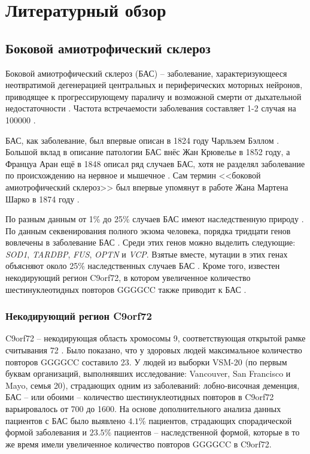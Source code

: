 \chapter{Литературный обзор} \label{chapt1}

\section{Боковой амиотрофический склероз} \label{sect_ALS}

Боковой амиотрофический склероз (БАС) -- заболевание, характеризующееся неотвратимой дегенерацией центральных и периферических моторных нейронов, приводящее к прогрессирующему параличу и возможной смерти от дыхательной недостаточности \cite{Alavi2013,Andersen2003,Drechsel2012,Haidet-Phillips2011}. Частота встречаемости заболевания составляет 1-2 случая на 100000 \cite{Alavi2013,Brotherton2012,Brown1997}.

БАС, как заболевание, был впервые описан в 1824 году Чарльзем Бэллом \cite{Rowland2001}. Большой вклад в описание патологии БАС внёс Жан Крювелье в 1852 году, а Француа Аран ещё в 1848 описал ряд случаев БАС, хотя не разделял заболевание по происхождению на нервное и мышечное \cite{Rowland2001, Marangi2015}. Сам термин <<боковой амиотрофический склероз>> был впервые упомянут в работе Жана Мартена Шарко в 1874 году \cite{Rowland2001}.

По разным данным от 1\% до 25\% случаев БАС имеют наследственную природу \cite{Abe1996,Alavi2013,Belzil2012,Eisen2008,Renton2011}. По данным секвенирования полного экзома человека, порядка тридцати генов вовлечены в заболевание БАС \cite{Cirulli2015}. Среди этих генов можно выделить следующие: \textit{SOD1}, \textit{TARDBP}, \textit{FUS}, \textit{OPTN} и \textit{VCP}. Взятые вместе, мутации в этих генах объясняют около 25\% наследственных случаев БАС \cite{Renton2011}. Кроме того, известен некодирующий регион C9orf72, в котором увеличенное количество шестинуклеотидных повторов GGGGCC также приводит к БАС \cite{Renton2011,DeJesus-Hernandez2011}.

\subsection{Некодирующий регион C9orf72} \label{subsect_C9orf72}

C9orf72 -- некодирующая область хромосомы 9, соответствующая открытой рамке считывания 72 \cite{DeJesus-Hernandez2011}. Было показано, что у здоровых людей максимальное количество повторов GGGGCC составило 23. У людей из выборки VSM-20 (по первым буквам организаций, выполнявших исследование: Vancouver, San Francisco и Mayo, семья 20), страдающих одним из заболеваний:  	лобно-височная деменция, БАС -- или обоими -- количество шестинуклеотидных повторов в C9orf72 варьировалось от 700 до 1600. На основе дополнительного анализа данных пациентов с БАС было выявлено $4.1$\% пациентов, страдающих спорадической формой заболевания и $23.5$\% пациентов -- наследственной формой, которые в то же время имели увеличенное количество повторов GGGGCC в C9orf72. 

